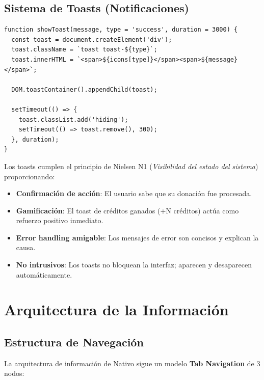 \documentclass[12pt, a4paper]{article}
\begin{document}
\subsection{Sistema de Toasts (Notificaciones)}

\begin{lstlisting}[style=javascript, caption={Sistema de toasts dinámicos}]
function showToast(message, type = 'success', duration = 3000) {
  const toast = document.createElement('div');
  toast.className = `toast toast-${type}`;
  toast.innerHTML = `<span>${icons[type]}</span><span>${message}</span>`;

  DOM.toastContainer().appendChild(toast);

  setTimeout(() => {
    toast.classList.add('hiding');
    setTimeout(() => toast.remove(), 300);
  }, duration);
}
\end{lstlisting}

\begin{justificacionbox}
Los toasts cumplen el principio de Nielsen N1 (\textit{Visibilidad del estado del sistema}) proporcionando:
\begin{itemize}
  \item \textbf{Confirmación de acción}: El usuario sabe que su donación fue procesada.
  \item \textbf{Gamificación}: El toast de créditos ganados (+N créditos) actúa como refuerzo positivo inmediato.
  \item \textbf{Error handling amigable}: Los mensajes de error son concisos y explican la causa.
  \item \textbf{No intrusivos}: Los toasts no bloquean la interfaz; aparecen y desaparecen automáticamente.
\end{itemize}
\end{justificacionbox}

\newpage
\section{Arquitectura de la Información}

\subsection{Estructura de Navegación}

La arquitectura de información de Nativo sigue un modelo \textbf{Tab Navigation} de 3 nodos:
\end{document}
